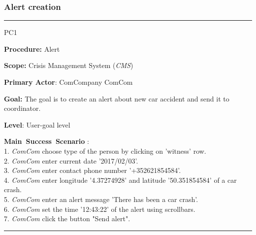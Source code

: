 \subsubsection{Alert creation}
\vspace{0.5cm}
\hrule
\begin{lyxlist}{PC1}
\small{
\item [\textbf{Procedure:}] Alert
\item [\textbf{Scope:}]  Crisis Management System (\emph{CMS})
\item [\textbf{Primary Actor}:] ComCompany ComCom
\item [\textbf{Goal:}] The goal is to create an alert about new car accident and
send it to coordinator.
\item [\textbf{Level}:] User-goal level
\item [\textbf{Main~Success~Scenario}]:\\
1. \emph{ComCom} choose type of the person by clicking on 'witness' row. \\
2. \emph{ComCom} enter current date '2017/02/03'. \\
3. \emph{ComCom} enter contact phone number '+352621854584'. \\
4. \emph{ComCom} enter longitude '4.37274928' and latitude '50.351854584' of a
car crash.\\
5. \emph{ComCom} enter an alert message 'There has been a car crash'.\\
6. \emph{ComCom} set the time '12:43:22' of the alert using scrollbars.\\
7. \emph{ComCom} click the button "Send alert".\\
}
\end{lyxlist}
\hrule
\vspace{0.5cm}

